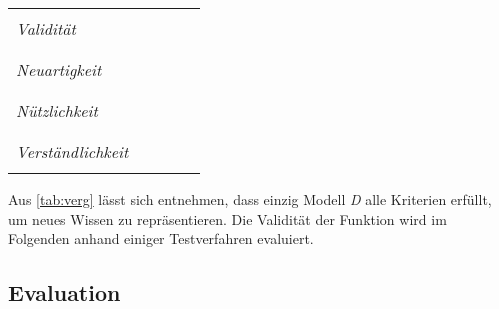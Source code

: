 \tablehead{}
\tabletail{}
\begin{center}%
\begin{supertabular}{ | P{4cm} | P{2cm}  | P{2cm} | P{2cm}  |  P{2cm}  |}
&&&&\\
\textit{Validität}	& \textcolor{red}{}	 & \textcolor{orange}{} & \textcolor{orange}{}	&\textcolor{green}{}	\\
&&&&\\
\hline
&&&&\\
\textit{Neuartigkeit}	& \textcolor{green}{}	 & \textcolor{green}{}	& \textcolor{green}{}	& \textcolor{green}{}	\\
&&&&\\
\hline
&&&&\\
\textit{Nützlichkeit}	&\textcolor{red}{}	 & \textcolor{orange}{} & \textcolor{orange}{}	& \textcolor{green}{}	\\
&&&&\\
\hline
&&&&\\
\textit{Verständlichkeit}	&\textcolor{red}{}	 & \textcolor{red}{}	& \textcolor{orange}{}	& \textcolor{green}{}	\\
&&&&\\
\hline
\end{supertabular}
\end{center}

Aus \vref{tab:verg} lässt sich entnehmen, dass einzig Modell \textit{D} alle Kriterien erfüllt, um neues Wissen zu repräsentieren. Die Validität der Funktion wird im Folgenden anhand einiger Testverfahren evaluiert.

\subsection{Evaluation}
\label{eva}

